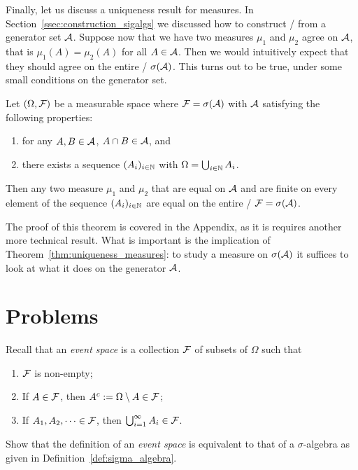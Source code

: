 Finally, let us discuss a uniqueness result for measures. In Section~\ref{ssec:construction_sigalgs} we discussed how to construct \sigalgs/ from a generator set $\mathcal A$. Suppose now that we have two measures $\mu_1$ and $\mu_2$ agree on $\mathcal A$, that is $\mu_1(A) = \mu_2(A)$ for all $A \in \mathcal A$. Then we would intuitively expect that they should agree on the entire \sigalg/ $\sigma(\mathcal A)$. This turns out to be true, under some small conditions on the generator set.

\begin{theorem}\label{thm:uniqueness_measures}
Let $(\Omega ,\mathcal F)$ be a measurable space where $\mathcal F = \sigma(\mathcal A)$ with $\mathcal A$ satisfying the following properties:
\begin{enumerate}
\item for any $A, B \in \mathcal A$, $A \cap B \in \mathcal A$, and
\item there exists a sequence $(A_i)_{i \in \mathbb N}$ with $\Omega = \bigcup_{i \in \mathbb N} A_i$.
\end{enumerate}
Then any two measure $\mu_1$ and $\mu_2$ that are equal on $\mathcal A$ and are finite on every element of the sequence $(A_i)_{i \in \mathbb N}$ are equal on the entire \sigalg/ $\mathcal F = \sigma(\mathcal A)$.
\end{theorem}

The proof of this theorem is covered in the Appendix, as it is requires another more technical result. What is important is the implication of Theorem~\ref{thm:uniqueness_measures}: to study a measure on $\sigma(\mathcal A)$ it suffices to look at what it does on the generator $\mathcal A$.



\section{Problems}

\begin{problem}\label{prb:event_space_are_sigma_algebras}
Recall that an \emph{event space} is a collection $\mathcal F$ of subsets of $\Omega$ such that
\begin{enumerate}
\item $\mathcal F$ is non-empty;
\item If $A \in \mathcal F$, then $A^c := \Omega \setminus A \in \mathcal F$;
\item If $A_1, A_2, \dots \in \mathcal F$, then $\bigcup_{i = 1}^\infty A_i \in \mathcal F$.
\end{enumerate}
Show that the definition of an \emph{event space} is equivalent to that of a $\sigma$-algebra as given in Definition~\ref{def:sigma_algebra}.
\end{problem}

